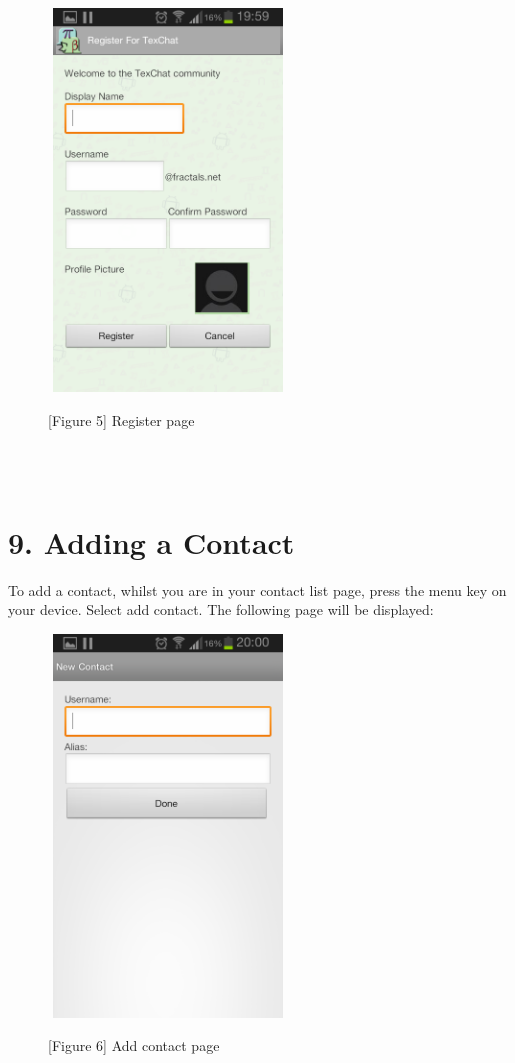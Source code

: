\documentclass[29pt,a4paper]{moderncv}
\begin{document}
		\noindent\begin{figure}
		\centering
		\includegraphics[width=2.5in, height=4.0in]{./Screenshot_2013-10-23-19-59-51.png} \\
		\centering \caption{[Figure 5] Register page}
		\end{figure}\\
		
		\\[Note: The option to register a user profile picture is not available in V1.0 of the TeXchat application.]
		\vspace{4mm}
		
		\section*{9. Adding a Contact}
				\vspace{5mm}
				To add a contact, whilst you are in your contact list page, press the menu key on your device. Select add contact. The following page will be displayed:\\
				\noindent\begin{figure}
				\centering
				\includegraphics[width=2.5in, height=4.0in]{./Screenshot_2013-10-23-20-00-25.png} \\
				\centering \caption{[Figure 6] Add contact page}
				\end{figure}\\
				
\end{document}
